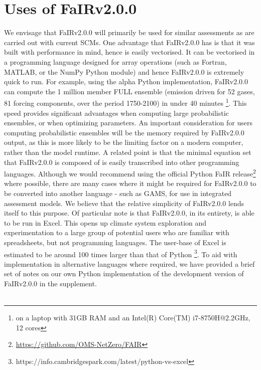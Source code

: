 \documentclass[gmd, manuscript]{copernicus}
\begin{document}
\section{Uses of FaIRv2.0.0} \label{FaIR_uses}
We envisage that FaIRv2.0.0 will primarily be used for similar assessments as are carried out with current SCMs. One advantage that FaIRv2.0.0 has is that it was built with performance in mind, hence is easily vectorised. It can be vectorised in a programming language designed for array operations (such as Fortran, MATLAB, or the NumPy Python module) and hence FaIRv2.0.0 is extremely quick to run. For example, using the alpha Python implementation, FaIRv2.0.0 can compute the 1 million member FULL ensemble (emission driven for 52 gases, 81 forcing components, over the period 1750-2100) in under 40 minutes \footnote{on a laptop with 31GB RAM and an Intel(R) Core(TM) i7-8750H@2.2GHz, 12 cores}. This speed provides significant advantages when computing large probabilistic ensembles, or when optimizing parameters. An important consideration for users computing probabilistic ensembles will be the memory required by FaIRv2.0.0 output, as this is more likely to be the limiting factor on a modern computer, rather than the model runtime. A related point is that the minimal equation set that FaIRv2.0.0 is composed of is easily transcribed into other programming languages. Although we would recommend using the official Python FaIR release\footnote{\url{https://github.com/OMS-NetZero/FAIR}} where possible, there are many cases where it might be required for FaIRv2.0.0 to be converted into another language - such as GAMS, for use in integrated assessment models. We believe that the relative simplicity of FaIRv2.0.0 lends itself to this purpose. Of particular note is that FaIRv2.0.0, in its entirety, is able to be run in Excel. This opens up climate system exploration and experimentation to a large group of potential users who are familiar with spreadsheets, but not programming languages. The user-base of Excel is estimated to be around 100 times larger than that of Python \footnote{https://info.cambridgespark.com/latest/python-vs-excel}. To aid with implementation in alternative languages where required, we have provided a brief set of notes on our own Python implementation of the development version of FaIRv2.0.0 in the supplement.\\\\
\end{document}
